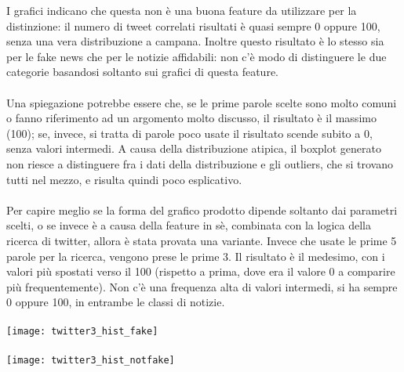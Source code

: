 \documentclass{article}
\begin{document}
\begin{multicols}{2}
				I grafici indicano che questa non è una buona feature da utilizzare per la distinzione: il numero di tweet correlati risultati è quasi sempre 0 oppure 100, senza una vera distribuzione a campana. Inoltre questo risultato è lo stesso sia per le fake news che per le notizie affidabili: non c'è modo di distinguere le due categorie basandosi soltanto sui grafici di questa feature.
				\\~\\
				Una spiegazione potrebbe essere che, se le prime parole scelte sono molto comuni o fanno riferimento ad un argomento molto discusso, il risultato è il massimo (100); se, invece, si tratta di parole poco usate il risultato scende subito a 0, senza valori intermedi.
				A causa della distribuzione atipica, il boxplot generato non riesce a distinguere fra i dati della distribuzione e gli outliers, che si trovano tutti nel mezzo, e risulta quindi poco esplicativo.
				\\~\\
				Per capire meglio se la forma del grafico prodotto dipende soltanto dai parametri scelti, o se invece è a causa della feature in sè, combinata con la logica della ricerca di twitter, allora è stata provata una variante. Invece che usate le prime 5 parole per la ricerca, vengono prese le prime 3. Il risultato è il medesimo, con i valori più spostati verso il 100 (rispetto a prima, dove era il valore 0 a comparire più frequentemente). Non c'è una frequenza alta di valori intermedi, si ha sempre 0 oppure 100, in entrambe le classi di notizie.
				\\~\\
				\texttt{[image: twitter3\_hist\_fake]}
				\\~\\
				\texttt{[image: twitter3\_hist\_notfake]}
				\\~\\
				

\end{multicols}
\end{document}
